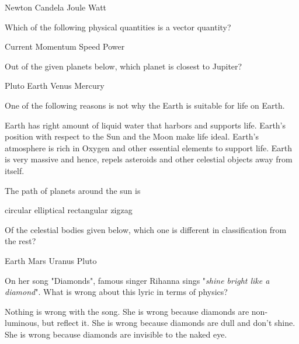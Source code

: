 \documentclass[12pt,addpoints]{exam}
\begin{document}
{{{\begin{questions}
\begin{oneparchoices}
						\choice Newton
						\choice Candela
						\choice Joule
						\choice Watt
					\end{oneparchoices}
					\question Which of the following physical quantities is a vector quantity? \\
					\begin{oneparchoices}
						\choice Current
						\choice Momentum
						\choice Speed
						\choice Power
					\end{oneparchoices}
					\question Out of the given planets below, which planet is closest to Jupiter? \\
					\begin{oneparchoices}
						\choice Pluto
						\choice Earth
						\choice Venus
						\choice Mercury
					\end{oneparchoices}
					\question One of the following reasons is not why the Earth is suitable for life on Earth.
					\begin{choices}
						\choice Earth has right amount of liquid water that harbors and supports life.
						\choice Earth's position with respect to the Sun and the Moon make life ideal.
						\choice Earth's atmosphere is rich in Oxygen and other essential elements to support life.
						\choice Earth is very massive and hence, repels asteroids and other celestial objects away from itself.
					\end{choices}
					\question The path of planets around the sun is \\
					\begin{oneparchoices}
						\choice circular
						\choice elliptical
						\choice rectangular
						\choice zigzag
					\end{oneparchoices}
					\question Of the celestial bodies given below, which one is different in classification from the rest? \\
					\begin{oneparchoices}
						\choice Earth
						\choice Mars
						\choice Uranus
						\choice Pluto
					\end{oneparchoices}
					\question On her song "Diamonds", famous singer Rihanna sings "\textit{shine bright like a diamond}". What is wrong about this lyric in terms of physics?
					\begin{choices}
						\choice Nothing is wrong with the song.
						\choice She is wrong because diamonds are non-luminous, but reflect it.
						\choice She is wrong because diamonds are dull and don't shine.
						\choice She is wrong because diamonds are invisible to the naked eye. 
					\end{choices} 

\end{questions}}}}
\end{document}
